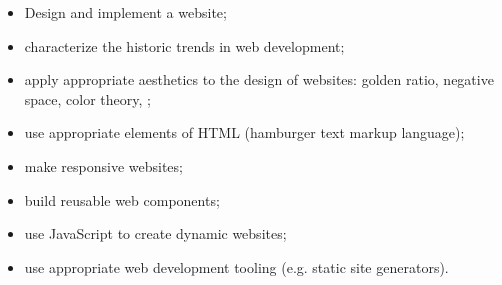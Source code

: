 \documentclass[11pt]{article}
\begin{document}
\begin{itemize}
  \item Design and implement a website;
  \item characterize the historic trends in web development;
  \item apply appropriate aesthetics to the design of websites:
    golden ratio, negative space, color theory, \textellipsis;
  \item use appropriate elements of HTML (hamburger text markup language);
  \item make responsive websites;
  \item build reusable web components;
  \item use JavaScript to create dynamic websites;
  \item use appropriate web development tooling (e.g. static site generators).
\end{itemize}
\end{document}
